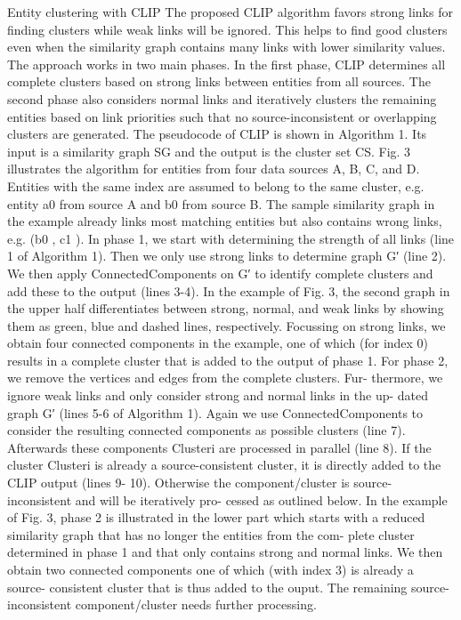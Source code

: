 \documentclass[runningheads]{llncs}
\begin{document}
Entity clustering with CLIP
The proposed CLIP algorithm favors strong links for finding clusters while weak links will be ignored. This helps to find good clusters even when the similarity graph contains many links with lower similarity values. The approach works in two main phases. In the first phase, CLIP determines all complete clusters based on strong links between entities from all sources. The second phase also considers normal links and iteratively clusters the remaining entities based on link priorities such that no source-inconsistent or overlapping clusters are generated.
The pseudocode of CLIP is shown in Algorithm 1. Its input is a similarity graph SG and the output is the cluster set CS. Fig. 3 illustrates the algorithm for entities from four data sources A, B, C, and D. Entities with the same index are assumed to belong to the same cluster, e.g. entity a0 from source A and b0 from source B. The sample similarity graph in the example already links most matching entities but also contains wrong links, e.g. (b0 , c1 ). In phase 1, we start with determining the strength of all links (line 1 of Algorithm 1). Then we only use strong links to determine graph G′ (line 2). We then apply ConnectedComponents on G′ to identify complete clusters and add these to the output (lines 3-4). In the example of Fig. 3, the second graph in the upper half differentiates between strong, normal, and weak links by showing them as green, blue and dashed lines, respectively. Focussing on strong links, we obtain four connected components in the example, one of which (for index 0) results in a complete cluster that is added to the output of phase 1.
For phase 2, we remove the vertices and edges from the complete clusters. Fur- thermore, we ignore weak links and only consider strong and normal links in the up- dated graph G′ (lines 5-6 of Algorithm 1). Again we use ConnectedComponents to consider the resulting connected components as possible clusters (line 7). Afterwards these components Clusteri are processed in parallel (line 8). If the cluster Clusteri is already a source-consistent cluster, it is directly added to the CLIP output (lines 9- 10). Otherwise the component/cluster is source-inconsistent and will be iteratively pro- cessed as outlined below. In the example of Fig. 3, phase 2 is illustrated in the lower part which starts with a reduced similarity graph that has no longer the entities from the com- plete cluster determined in phase 1 and that only contains strong and normal links. We then obtain two connected components one of which (with index 3) is already a source- consistent cluster that is thus added to the ouput. The remaining source-inconsistent component/cluster needs further processing.
\end{document}
